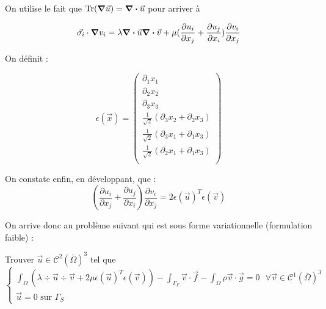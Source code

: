 On utilise le fait que $\operatorname{Tr}(\grad \vec{u}) = \div \vec{u}$ pour arriver à 

$$
\vec{\sigma_i} \cdot \grad v_i = \lambda \div \vec{u} \div \vec{v} + \mu (\frac{\partial u_i}{\partial x_j} + \frac{\partial u_j}{\partial x_i})\frac{\partial v_i}{\partial x_j}
$$

On définit :

$$
\epsilon(\vec{x})=
\begin{pmatrix}
    \partial_1 x_1\\
    \partial_2 x_2\\ 
    \partial_3 x_3\\
    \frac{1}{\sqrt{2}}(\partial_3 x_2 + \partial_2 x_3)\\
    \frac{1}{\sqrt{2}}(\partial_3 x_1 + \partial_1 x_3)\\
    \frac{1}{\sqrt{2}}(\partial_2 x_1 + \partial_1 x_3)\\
\end{pmatrix}
$$

On constate enfin, en développant, que :
$$
(\frac{\partial u_i}{\partial x_j} + \frac{\partial u_j}{\partial x_i})\frac{\partial v_i}{\partial x_j} = 2\epsilon(\vec{u})^T\epsilon(\vec{v})
$$

On arrive donc au problème suivant qui est sous forme variationnelle (formulation faible)  :

Trouver $\vec{u} \in \mathcal{C}^2(\bar{\Omega})^3$ tel que
\begin{equation}\label{varia}
    \begin{cases}
        \displaystyle\int_{\Omega} (\lambda \div \vec{u} \div \vec{v} + 2\mu \epsilon(\vec{u})^T \epsilon(\vec{v})) - \int_{\Gamma_F} \vec{v} \cdot \vec{f} - \int_\Omega \rho \vec{v} \cdot \vec{g} = 0 \textrm{ } \forall \vec{v} \in \mathcal{C}^1(\bar{\Omega})^3\\
        \vec{u} = 0 \textrm{ sur } \Gamma_S
    \end{cases}
\end{equation}

